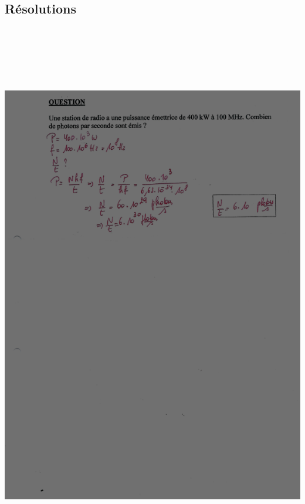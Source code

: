 {\subsection{Résolutions}

\includegraphics[width=17.448cm,height=24.063cm]{Pictures/10000001000002570000033B23A9DDE6A8AAA6C6.png}

}
